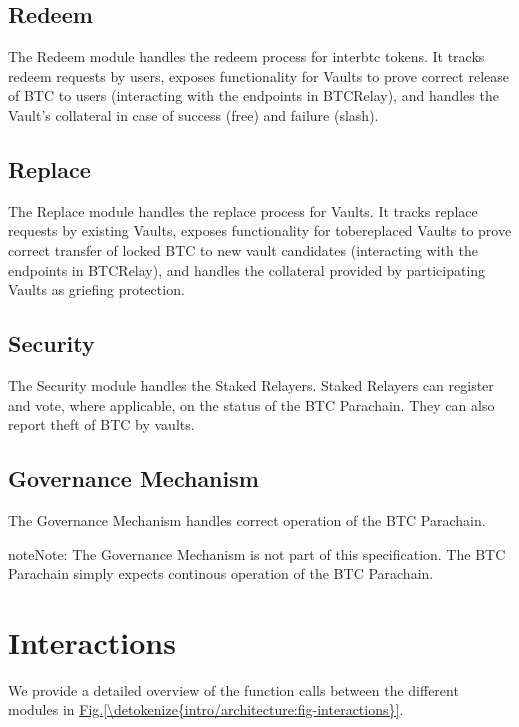 \documentclass[a4paper,10pt,english]{sphinxmanual}
\begin{document}
\subsection{Redeem}
\label{\detokenize{intro/architecture:redeem}}
The Redeem module handles the redeem process for interbtc tokens. It tracks redeem requests by users, exposes functionality for Vaults to prove correct release of BTC to users (interacting with the endpoints in BTC\sphinxhyphen{}Relay), and handles the Vault’s collateral in case of success (free) and failure (slash).


\subsection{Replace}
\label{\detokenize{intro/architecture:replace}}
The Replace module handles the replace process for Vaults.
It tracks replace requests by existing Vaults, exposes functionality for to\sphinxhyphen{}be\sphinxhyphen{}replaced Vaults to prove correct transfer of locked BTC to new vault candidates (interacting with the endpoints in BTC\sphinxhyphen{}Relay), and handles the collateral provided by participating Vaults as griefing protection.


\subsection{Security}
\label{\detokenize{intro/architecture:security}}
The Security module handles the Staked Relayers. Staked Relayers can register and vote, where applicable, on the status of the BTC Parachain. They can also report theft of BTC by vaults.


\subsection{Governance Mechanism}
\label{\detokenize{intro/architecture:governance-mechanism}}
The Governance Mechanism handles correct operation of the BTC Parachain.

\begin{sphinxadmonition}{note}{Note:}
The Governance Mechanism is not part of this specification. The BTC Parachain simply expects continous operation of the BTC Parachain.
\end{sphinxadmonition}


\section{Interactions}
\label{\detokenize{intro/architecture:interactions}}
We provide a detailed overview of the function calls between the different modules in \hyperref[\detokenize{intro/architecture:fig-interactions}]{Fig.\@ \ref{\detokenize{intro/architecture:fig-interactions}}}.
\end{document}
